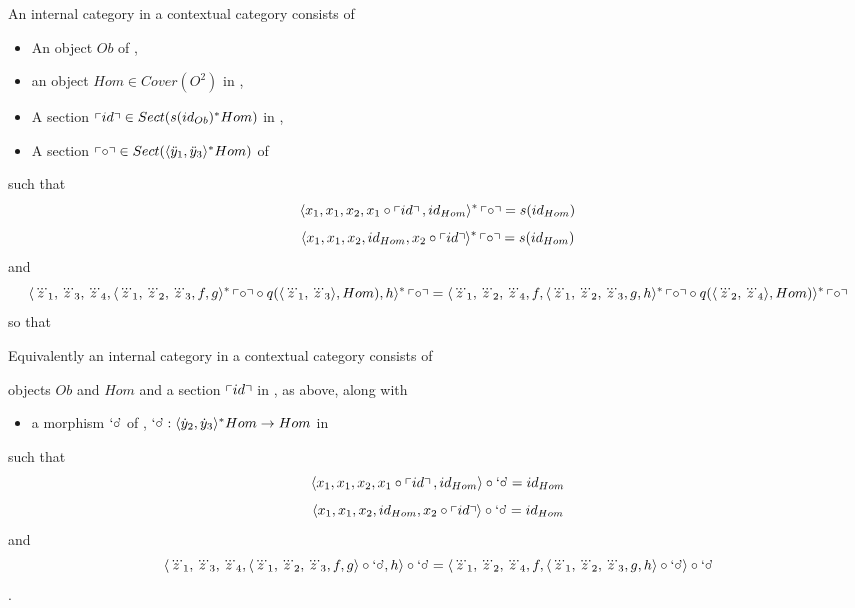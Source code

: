 \begin{lemma}
\label{internalcategorylemma}
An internal category in a contextual category \catcw consists of
\begin{itemize}
\item An object $Ob$ of \catc,
\item an object $Hom \in Cover(O^2)$ in \catc,
\item A section $\left\ulcorner id\right\urcorner \in Sect(s(id_{Ob})^*Hom)$ in \catc, 
\item A section $\left\ulcorner\circ\right\urcorner \in Sect(\langle\ddot y_1,\ddot y_3\rangle^*Hom) $ of \catc \\ 
													
\end{itemize}
such that
\begin{equation}
\label{leftidentityaxiom}
\leftidentitymapped
\end{equation}
\begin{equation}
\label{rightidentityaxiom}
\rightidentitymapped
\end{equation}
and
\begin{equation}
\label{associativityaxiom}
\assoclhsremapped = \assocrhsremapped
\end{equation}
so that


Equivalently an internal category in a contextual category \catcw consists of
\item objects $Ob$ and  $Hom$  and a section $\left\ulcorner id\right\urcorner$ in \catc,  as above, along with
\begin{itemize}
\item a morphism $\text{`$\circ$\kern-2pt'}$ of \catc, $\text{`$\circ$\kern-2pt'}: \langle\dot y_2,\dot y_3\rangle^*Hom \rightarrow Hom$ in \catc
\end{itemize}
such that
\begin{equation}
\label{leftidentityrepresentation2}
\tuple{x_1,x_1,x_2,x_1\circ \fid,id_{Hom}} \circ \compmorph =id_{Hom}
\end{equation}
\begin{equation}
\label{rightidentityrepresentation2}
\tuple{x_1,x_1,x_2,id_{Hom},x_2 \circ \fid} \circ \compmorph =id_{Hom}
\end{equation}
and
\begin{equation}
\label{associativityrepresentation2}
\assocequivalentlhs = \assocequivalentrhs
\end{equation}.
\end{lemma}
